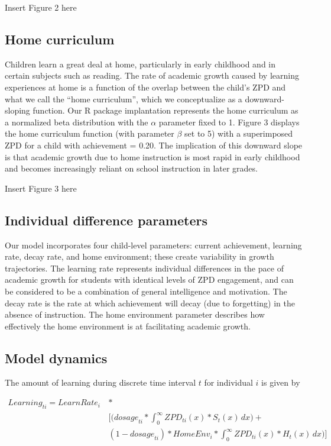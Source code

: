 \documentclass[english,floatsintext,man]{apa6}
\theoremstyle{definition}
\theoremstyle{definition}
\theoremstyle{definition}
\theoremstyle{remark}
\begin{document}
Insert Figure 2 here

\subsection{Home curriculum}\label{home-curriculum}

Children learn a great deal at home, particularly in early childhood and
in certain subjects such as reading. The rate of academic growth caused
by learning experiences at home is a function of the overlap between the
child's ZPD and what we call the \enquote{home curriculum}, which we
conceptualize as a downward-sloping function. Our R package implantation
represents the home curriculum as a normalized beta distribution with
the \(\alpha\) parameter fixed to 1. Figure 3 displays the home
curriculum function (with parameter \(\beta\) set to 5) with a
superimposed ZPD for a child with achievement = 0.20. The implication of
this downward slope is that academic growth due to home instruction is
most rapid in early childhood and becomes increasingly reliant on school
instruction in later grades.

Insert Figure 3 here

\subsection{Individual difference
parameters}\label{individual-difference-parameters}

Our model incorporates four child-level parameters: current achievement,
learning rate, decay rate, and home environment; these create
variability in growth trajectories. The learning rate represents
individual differences in the pace of academic growth for students with
identical levels of ZPD engagement, and can be considered to be a
combination of general intelligence and motivation. The decay rate is
the rate at which achievement will decay (due to forgetting) in the
absence of instruction. The home environment parameter describes how
effectively the home environment is at facilitating academic growth.

\subsection{Model dynamics}\label{model-dynamics}

The amount of learning during discrete time interval \(t\) for
individual \(i\) is given by

\begin{equation}
\begin{split}
\textit{Learning}_{ti} = \textit{LearnRate}_i \, &* \\
  & \big[ \big( \textit{dosage}_{ti} * \int_{0}^{\infty} \textit{ZPD}_{ti}(x) * S_t(x) \, dx \big) + \\ 
  & (1-\textit{dosage}_{ti}) * \textit{HomeEnv}_i * \int_{0}^{\infty} \textit{ZPD}_{ti}(x) * H_t(x) \, dx \big) \big]
\end{split}
\end{equation}
\end{document}

